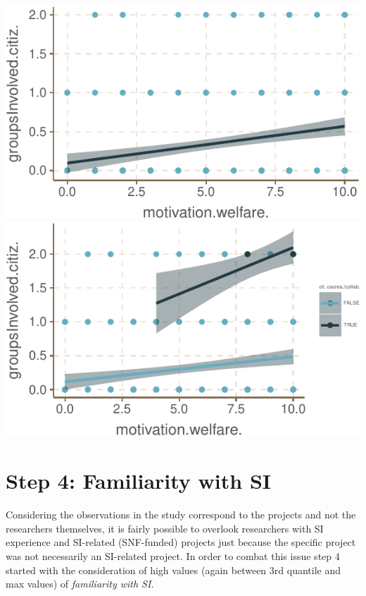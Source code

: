 \documentclass[]{tufte-book}
\begin{document}
\includegraphics{03_SIVOCS_int-cand_files/figure-latex/wf_gi_lm-1}
\includegraphics{03_SIVOCS_int-cand_files/figure-latex/wf_gi_lm-2}

\hypertarget{step-4-familiarity-with-si}{%
\section{Step 4: Familiarity with SI}\label{step-4-familiarity-with-si}}

Considering the observations in the study correspond to the projects and
not the researchers themselves, it is fairly possible to overlook
researchers with SI experience and SI-related (SNF-funded) projects just
because the specific project was not necessarily an SI-related project.
In order to combat this issue step 4 started with the consideration of
high values (again between 3rd quantile and max values) of
\emph{familiarity with SI}.
\end{document}
